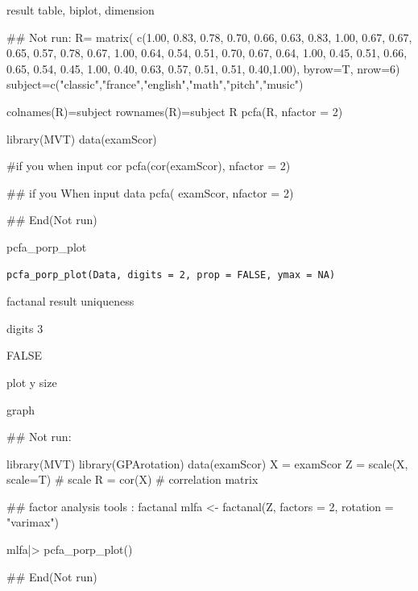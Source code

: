 \documentclass[a4paper]{book}
\begin{document}
%
\begin{Value}
result table, biplot, dimension
\end{Value}
%
\begin{Examples}
\begin{ExampleCode}
## Not run: 
R= matrix(
c(1.00, 0.83, 0.78, 0.70, 0.66, 0.63,
  0.83, 1.00, 0.67, 0.67, 0.65, 0.57,
  0.78, 0.67, 1.00, 0.64, 0.54, 0.51,
  0.70, 0.67, 0.64, 1.00, 0.45, 0.51,
  0.66, 0.65, 0.54, 0.45, 1.00, 0.40,
  0.63, 0.57, 0.51, 0.51, 0.40,1.00),
 byrow=T, nrow=6)
subject=c("classic","france","english","math","pitch","music")

colnames(R)=subject
rownames(R)=subject
R
pcfa(R, nfactor = 2)

library(MVT)
data(examScor)

#if you when input cor
pcfa(cor(examScor), nfactor = 2)

## if you When input data
pcfa( examScor, nfactor = 2)


## End(Not run)

\end{ExampleCode}
\end{Examples}
%
\begin{Description}
pcfa\_porp\_plot
\end{Description}
%
\begin{Usage}
\begin{verbatim}
pcfa_porp_plot(Data, digits = 2, prop = FALSE, ymax = NA)
\end{verbatim}
\end{Usage}
%
\begin{Arguments}
\begin{ldescription}
\item[\code{Data}] factanal result uniqueness

\item[\code{digits}] digits 3

\item[\code{prop}] FALSE

\item[\code{ymax}] plot y size
\end{ldescription}
\end{Arguments}
%
\begin{Value}
graph
\end{Value}
%
\begin{Examples}
\begin{ExampleCode}
## Not run: 

library(MVT)
library(GPArotation)
data(examScor)
X = examScor
Z = scale(X, scale=T)  # scale
R = cor(X)  # correlation matrix

## factor analysis tools : factanal
mlfa <- factanal(Z, factors = 2, rotation = "varimax")

mlfa|> pcfa_porp_plot()


## End(Not run)
\end{ExampleCode}
\end{Examples}
\end{document}
